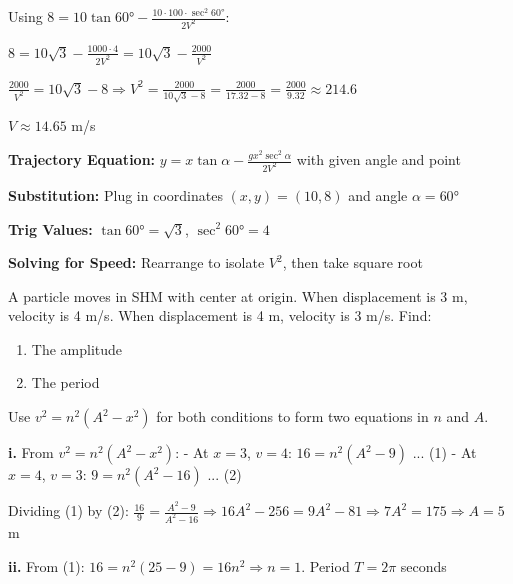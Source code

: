 \begin{solution}
Using $8 = 10\tan 60° - \frac{10 \cdot 100 \cdot \sec^2 60°}{2V^2}$:

$8 = 10\sqrt{3} - \frac{1000 \cdot 4}{2V^2} = 10\sqrt{3} - \frac{2000}{V^2}$

$\frac{2000}{V^2} = 10\sqrt{3} - 8 \Rightarrow V^2 = \frac{2000}{10\sqrt{3} - 8} = \frac{2000}{17.32 - 8} = \frac{2000}{9.32} \approx 214.6$

$V \approx 14.65$ m/s
\end{solution}

\begin{takeaways}
\item \textbf{Trajectory Equation:} $y = x\tan\alpha - \frac{gx^2\sec^2\alpha}{2V^2}$ with given angle and point
\item \textbf{Substitution:} Plug in coordinates $(x, y) = (10, 8)$ and angle $\alpha = 60°$
\item \textbf{Trig Values:} $\tan 60° = \sqrt{3}$, $\sec^2 60° = 4$
\item \textbf{Solving for Speed:} Rearrange to isolate $V^2$, then take square root
\end{takeaways}

\begin{problem}
A particle moves in SHM with center at origin. When displacement is 3 m, velocity is 4 m/s. When displacement is 4 m, velocity is 3 m/s. Find:
\begin{enumerate}[label=\textbf{\roman*.}]
    \item The amplitude
    \item The period
\end{enumerate}
\end{problem}

\begin{hint}
Use $v^2 = n^2(A^2 - x^2)$ for both conditions to form two equations in $n$ and $A$.
\end{hint}

\begin{solution}
\textbf{i.} From $v^2 = n^2(A^2 - x^2)$:
- At $x=3$, $v=4$: $16 = n^2(A^2 - 9)$ ... (1)
- At $x=4$, $v=3$: $9 = n^2(A^2 - 16)$ ... (2)

Dividing (1) by (2): $\frac{16}{9} = \frac{A^2 - 9}{A^2 - 16} \Rightarrow 16A^2 - 256 = 9A^2 - 81 \Rightarrow 7A^2 = 175 \Rightarrow A = 5$ m

\textbf{ii.} From (1): $16 = n^2(25 - 9) = 16n^2 \Rightarrow n = 1$. Period $T = 2\pi$ seconds
\end{solution}

